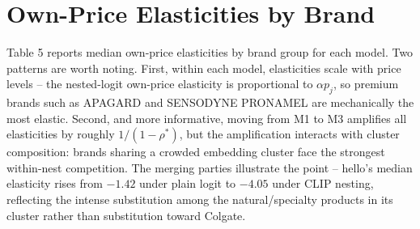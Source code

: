 \vspace{1em}

\section{Own-Price Elasticities by
Brand}\label{own-price-elasticities-by-brand}

Table 5 reports median own-price elasticities by brand group for each
model. Two patterns are worth noting. First, within each model,
elasticities scale with price levels -- the nested-logit own-price
elasticity is proportional to \(\alpha p_j\), so premium brands such as
APAGARD and SENSODYNE PRONAMEL are mechanically the most elastic.
Second, and more informative, moving from M1 to M3 amplifies all
elasticities by roughly \(1/(1-\rho^{*})\), but the amplification
interacts with cluster composition: brands sharing a crowded embedding
cluster face the strongest within-nest competition. The merging parties
illustrate the point -- hello's median elasticity rises from \(-1.42\)
under plain logit to \(-4.05\) under CLIP nesting, reflecting the
intense substitution among the natural/specialty products in its cluster
rather than substitution toward Colgate.

